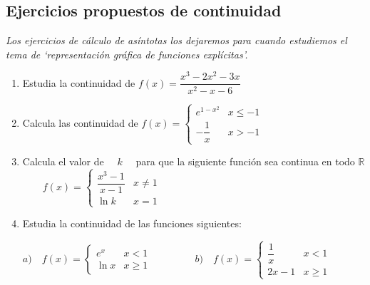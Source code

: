 	
	
	
	
	\subsection{Ejercicios propuestos de continuidad}
	
	\emph{Los ejercicios de cálculo de asíntotas los dejaremos para cuando estudiemos el tema de `representación gráfica de funciones explícitas'.}
	
		\begin{enumerate}[1).-  ]
		
		\item Estudia la continuidad de $f(x)=\dfrac {x^3-2x^2-3x}{x^2-x-6}$
		
		\rightline{\textcolor{gris}{Solución: $x=-2$ asintótica; $x=3$ evitable.}}
		
		\item Calcula las continuidad de $f(x)=\left\{ \begin{matrix} e^{1-x^2} & x\le -1 \\ -\dfrac 1 x & x>-1 \end{matrix} \right. $
		
		\rightline{\textcolor{gris}{Solución: $x=-1$, salto; $x=0$, asintótica}}
		
		\item Calcula el valor de $\quad k \quad$ para que la siguiente función sea continua en todo $\mathbb R$  $\qquad f(x)=\left\{ \begin{matrix} \dfrac{x^3-1}{x-1} & x\neq 1 \\ \ln k & x=1 \end{matrix} \right. $
		
		\rightline{\textcolor{gris}{Solución: $k=e^3$}}
		
		\item Estudia la continuidad de las funciones siguientes:
		
		$a)\quad  f(x)=\left\{ \begin{matrix} e^x & x< 1 \\ \ln x & x\ge1 \end{matrix} \right. $ $\qquad \qquad b)\quad  f(x)=\left\{ \begin{matrix} \dfrac 1 x & x< 1 \\  2x-1 & x\ge1 \end{matrix} \right. $ 
		
		

\end{enumerate}
